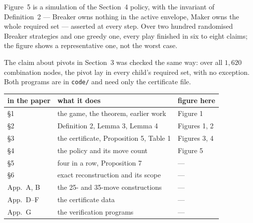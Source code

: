 \documentclass[11pt,a4paper]{article}
\begin{document}
Figure~5 is a simulation of the Section~4 policy, with the invariant of
Definition~2 --- Breaker owns nothing in the active envelope, Maker owns the whole
required set --- asserted at every step. Over two hundred randomised Breaker
strategies and one greedy one, every play finished in six to eight claims; the
figure shows a representative one, not the worst case.

The claim about pivots in Section~3 was checked the same way: over all $1{,}620$
combination nodes, the pivot lay in every child's required set, with no exception.
Both programs are in \texttt{code/} and need only the certificate file.


\vspace{6pt}
\begin{center}
\small
\begin{tabular}{@{}lll@{}}
\toprule
in the paper & what it does & figure here \\
\midrule
\S1 & the game, the theorem, earlier work & Figure 1 \\
\S2 & Definition 2, Lemma 3, Lemma 4 & Figures 1, 2 \\
\S3 & the certificate, Proposition 5, Table 1 & Figures 3, 4 \\
\S4 & the policy and its move count & Figure 5 \\
\S5 & four in a row, Proposition 7 & --- \\
\S6 & exact reconstruction and its scope & --- \\
App.~A, B & the 25- and 35-move constructions & --- \\
App.~D--F & the certificate data & --- \\
App.~G & the verification programs & --- \\
\bottomrule
\end{tabular}
\end{center}
\end{document}
